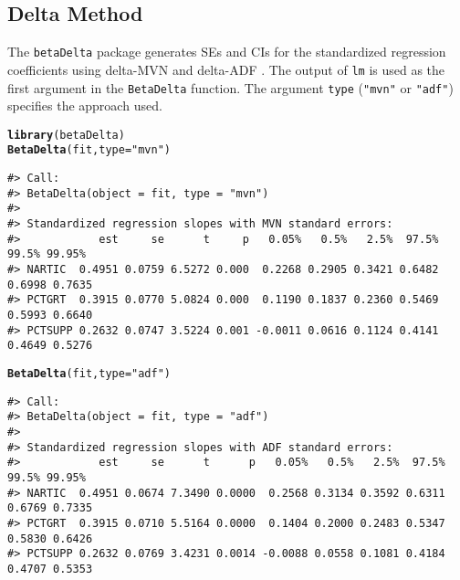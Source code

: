 \documentclass[man]{apa7}\usepackage[]{graphicx}\usepackage[]{xcolor}
\makeatletter
\newcommand{\hlstr}[1]{\textcolor[rgb]{0.192,0.494,0.8}{#1}}%
\newcommand{\hlstd}[1]{\textcolor[rgb]{0.345,0.345,0.345}{#1}}%
\newcommand{\hlkwc}[1]{\textcolor[rgb]{0.333,0.667,0.333}{#1}}%
\newcommand{\hlkwd}[1]{\textcolor[rgb]{0.737,0.353,0.396}{\textbf{#1}}}%
\newenvironment{kframe}{%
 \def\at@end@of@kframe{}%
 \ifinner\ifhmode%
  \def\at@end@of@kframe{\end{minipage}}%
  \begin{minipage}{\columnwidth}%
 \fi\fi%
 \def\FrameCommand##1{\hskip\@totalleftmargin \hskip-\fboxsep
 \colorbox{shadecolor}{##1}\hskip-\fboxsep
     \hskip-\linewidth \hskip-\@totalleftmargin \hskip\columnwidth}%
 \MakeFramed {\advance\hsize-\width
   \@totalleftmargin\z@ \linewidth\hsize
   \@setminipage}}%
 {\par\unskip\endMakeFramed%
 \at@end@of@kframe}
\newenvironment{knitrout}{}{} %
\makeatother
\begin{document}
\subsection{Delta Method}

The \texttt{betaDelta} package generates SEs and CIs for the standardized regression coefficients using delta-MVN \parencite{Lib-Regression-Standardized-Coefficients-Delta-Yuan-2011} and delta-ADF \parencite{Lib-Regression-Standardized-Coefficients-Delta-Jones-2015}. The output of \texttt{lm} is used as the first argument in the  \texttt{BetaDelta} function. The argument \texttt{type} (\texttt{"mvn"} or \texttt{"adf"}) specifies the approach used.

\vspace{-.5em}
\begin{minipage}{.75\linewidth}
	\singlespacing
\begin{knitrout}\scriptsize
{}\color{fgcolor}\begin{kframe}
\begin{alltt}
\hlkwd{library}\hlstd{(betaDelta)}
\hlkwd{BetaDelta}\hlstd{(fit,} \hlkwc{type} \hlstd{=} \hlstr{"mvn"}\hlstd{)}
\end{alltt}
\begin{verbatim}
#> Call:
#> BetaDelta(object = fit, type = "mvn")
#> 
#> Standardized regression slopes with MVN standard errors:
#>            est     se      t     p   0.05%   0.5%   2.5%  97.5%  99.5% 99.95%
#> NARTIC  0.4951 0.0759 6.5272 0.000  0.2268 0.2905 0.3421 0.6482 0.6998 0.7635
#> PCTGRT  0.3915 0.0770 5.0824 0.000  0.1190 0.1837 0.2360 0.5469 0.5993 0.6640
#> PCTSUPP 0.2632 0.0747 3.5224 0.001 -0.0011 0.0616 0.1124 0.4141 0.4649 0.5276
\end{verbatim}
\begin{alltt}
\hlkwd{BetaDelta}\hlstd{(fit,} \hlkwc{type} \hlstd{=} \hlstr{"adf"}\hlstd{)}
\end{alltt}
\begin{verbatim}
#> Call:
#> BetaDelta(object = fit, type = "adf")
#> 
#> Standardized regression slopes with ADF standard errors:
#>            est     se      t      p   0.05%   0.5%   2.5%  97.5%  99.5% 99.95%
#> NARTIC  0.4951 0.0674 7.3490 0.0000  0.2568 0.3134 0.3592 0.6311 0.6769 0.7335
#> PCTGRT  0.3915 0.0710 5.5164 0.0000  0.1404 0.2000 0.2483 0.5347 0.5830 0.6426
#> PCTSUPP 0.2632 0.0769 3.4231 0.0014 -0.0088 0.0558 0.1081 0.4184 0.4707 0.5353
\end{verbatim}
\end{kframe}
\end{knitrout}
\end{minipage}
\end{document}
